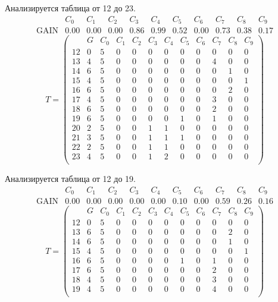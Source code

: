 Анализируется таблица от 12 до 23.
$$ 
\begin{array}{lcccc|c|ccccc}
	  & C_{0} & C_{1} & C_{2} & C_{3} & C_{4} & C_{5} & C_{6} & C_{7} & C_{8} & C_{9}\\
 \textrm{GAIN} & 0.00 & 0.00 & 0.00 & 0.86 & 0.99 & 0.52 & 0.00 & 0.73 & 0.38 & 0.17
\end{array}
 $$
$$
T = \left( \begin{array}{lccccc|c|ccccc}
	 & G & C_{0} & C_{1} & C_{2} & C_{3} & C_{4} & C_{5} & C_{6} & C_{7} & C_{8} & C_{9}\\
	12 & 0 & 5 & 0 & 0 & 0 & 0 & 0 & 0 & 0 & 0 & 0\\
	13 & 4 & 5 & 0 & 0 & 0 & 0 & 0 & 0 & 4 & 0 & 0\\
	14 & 6 & 5 & 0 & 0 & 0 & 0 & 0 & 0 & 0 & 1 & 0\\
	15 & 4 & 5 & 0 & 0 & 0 & 0 & 0 & 0 & 0 & 0 & 1\\
	16 & 6 & 5 & 0 & 0 & 0 & 0 & 0 & 0 & 0 & 2 & 0\\
	17 & 4 & 5 & 0 & 0 & 0 & 0 & 0 & 0 & 3 & 0 & 0\\
	18 & 6 & 5 & 0 & 0 & 0 & 0 & 0 & 0 & 2 & 0 & 0\\
	19 & 6 & 5 & 0 & 0 & 0 & 0 & 1 & 0 & 1 & 0 & 0\\
	20 & 2 & 5 & 0 & 0 & 1 & 1 & 0 & 0 & 0 & 0 & 0\\
	21 & 3 & 5 & 0 & 0 & 1 & 1 & 1 & 0 & 0 & 0 & 0\\
	22 & 2 & 5 & 0 & 0 & 1 & 1 & 0 & 0 & 0 & 0 & 0\\
	23 & 4 & 5 & 0 & 0 & 1 & 2 & 0 & 0 & 0 & 0 & 0\\
\end{array} \right)
$$

Анализируется таблица от 12 до 19.
$$ 
\begin{array}{lccccccc|c|cc}
	  & C_{0} & C_{1} & C_{2} & C_{3} & C_{4} & C_{5} & C_{6} & C_{7} & C_{8} & C_{9}\\
 \textrm{GAIN} & 0.00 & 0.00 & 0.00 & 0.00 & 0.00 & 0.10 & 0.00 & 0.59 & 0.26 & 0.16
\end{array}
 $$
$$
T = \left( \begin{array}{lcccccccc|c|cc}
	 & G & C_{0} & C_{1} & C_{2} & C_{3} & C_{4} & C_{5} & C_{6} & C_{7} & C_{8} & C_{9}\\
	12 & 0 & 5 & 0 & 0 & 0 & 0 & 0 & 0 & 0 & 0 & 0\\
	13 & 6 & 5 & 0 & 0 & 0 & 0 & 0 & 0 & 0 & 2 & 0\\
	14 & 6 & 5 & 0 & 0 & 0 & 0 & 0 & 0 & 0 & 1 & 0\\
	15 & 4 & 5 & 0 & 0 & 0 & 0 & 0 & 0 & 0 & 0 & 1\\
	16 & 6 & 5 & 0 & 0 & 0 & 0 & 1 & 0 & 1 & 0 & 0\\
	17 & 6 & 5 & 0 & 0 & 0 & 0 & 0 & 0 & 2 & 0 & 0\\
	18 & 4 & 5 & 0 & 0 & 0 & 0 & 0 & 0 & 3 & 0 & 0\\
	19 & 4 & 5 & 0 & 0 & 0 & 0 & 0 & 0 & 4 & 0 & 0\\
\end{array} \right)
$$

